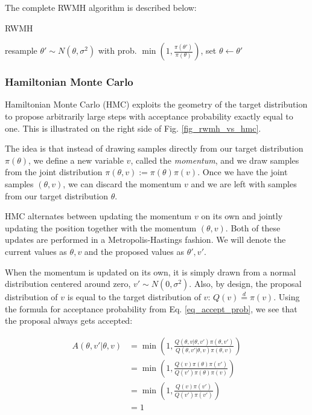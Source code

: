 \documentclass[12pt]{article}
\begin{document}
The complete RWMH algorithm is described below:
\begin{algorithm}
\caption{RWMH}
\label{alg_rwmh}
\begin{algorithmic}
 
	\State resample $\theta' \sim N(\theta, \sigma^2)$ 
	\State with prob. $\min{(1, \frac{\pi(\theta')}{\pi(\theta)})}$, set $\theta \gets \theta'$ 
\EndFor
\end{algorithmic}
\end{algorithm}

\subsubsection{Hamiltonian Monte Carlo}

Hamiltonian Monte Carlo (HMC) exploits the geometry of the target distribution to propose arbitrarily large steps with acceptance probability exactly equal to one. \cite{hmc} This is illustrated on the right side of Fig. \ref{fig_rwmh_vs_hmc}.

The idea is that instead of drawing samples directly from our target distribution $\pi(\theta)$, we define a new variable $v$, called the \textit{momentum}, and we draw samples from the joint distribution $\pi(\theta, v) := \pi(\theta)\pi(v)$. Once we have the joint samples $(\theta, v)$, we can discard the momentum $v$ and we are left with samples from our target distribution $\theta$.

HMC alternates between updating the momentum $v$ on its own and jointly updating the position together with the momentum $(\theta, v)$. Both of these updates are performed in a Metropolis-Hastings fashion. We will denote the current values as $\theta, v$ and the proposed values as $\theta', v'$.

When the momentum is updated on its own, it is simply drawn from a normal distribution centered around zero, $v' \sim N(0, \sigma^2)$. Also, by design, the proposal distribution of $v$ is equal to the target distribution of $v$: $Q(v) \overset{d}{=} \pi(v)$. Using the formula for acceptance probability from Eq. \ref{eq_accept_prob}, we see that the proposal always gets accepted:

\begin{align}
A(\theta,v'|\theta,v) &= \min \left(1, \frac{Q(\theta,v|\theta,v')\pi(\theta,v')}{Q(\theta,v'|\theta,v)\pi(\theta,v)} \right) \\
&= \min \left(1, \frac{Q(v)\pi(\theta)\pi(v')}{Q(v')\pi(\theta)\pi(v)} \right) \\
&= \min \left(1, \frac{Q(v)\pi(v')}{Q(v')\pi(v')} \right) \\
&= 1 \\
\end{align}
\end{document}
